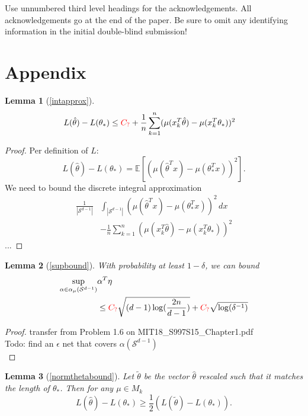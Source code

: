 \documentclass[twoside]{article} \usepackage{aistats2017}
\newcommand{\EV}[1] {
  \mathbb{E}\left[#1\right]}
\newtheorem*{lemma*}{Lemma}
\newcommand{\uc}{
\color{red}C_?\color{black}
}
\begin{document}
Use unnumbered third level headings for the acknowledgements.  All
acknowledgements go at the end of the paper.  Be sure to omit any
identifying information in the initial double-blind submission!






\newpage
\section{Appendix}
\begin{lemma*}[\ref{intapprox}]
\begin{align*}
&L(\hat{\theta})-L(\theta_*) \leq\uc + \frac{1}{n}\sum_{k=1}^n(\mu(x_k^T\hat{\theta})-\mu(x_k^T\theta_*))^2
\end{align*}
\end{lemma*}
\begin{proof}
Per definition of $L$:
$$L(\hat{\theta})-L(\theta_*) = \EV{(\mu(\hat{\theta}^Tx)-\mu(\theta_*^Tx))^2}.$$
We need to bound the discrete integral approximation
\begin{align*}
    \frac{1}{|\mathcal{S}^{d-1}|}&\int_{|\mathcal{S}^{d-1}|}(\mu(\hat{\theta}^Tx)-\mu(\theta_*^Tx))^2\,dx\\
    &-\frac{1}{n}\sum_{k=1}^n(\mu(x_k^T\hat{\theta})-\mu(x_k^T\theta_*))^2
\end{align*}
...
\end{proof}
\begin{lemma*}[\ref{supbound}]
    With probability at least $1-\delta$, we can bound
    \begin{align*}
    \sup_{\alpha\in\alpha_\mu(\mathcal{S}^{d-1})}&\alpha^T\eta\\
    &\leq \uc\sqrt{(d-1)\log(\frac{2n}{d-1})}+\uc\sqrt{\log(\delta^{-1})}
    \end{align*}
\end{lemma*}
\begin{proof}
transfer from Problem 1.6 on MIT18\_S997S15\_Chapter1.pdf\\
\color{red}Todo: find an $\epsilon$ net that covers $\alpha(\mathcal{S}^{d-1})$\color{black}\
\\
\end{proof}
\begin{lemma*}[\ref{normthetabound}]
    Let $\tilde{\theta}$ be the vector $\hat{\theta}$ rescaled such that it matches the length of $\theta_*$. Then for any $\mu\in M_k$
    $$L(\hat{\theta})-L(\theta_*) \geq \frac{1}{2}(L(\tilde{\theta})-L(\theta_*)).$$
\end{lemma*}
\end{document}
